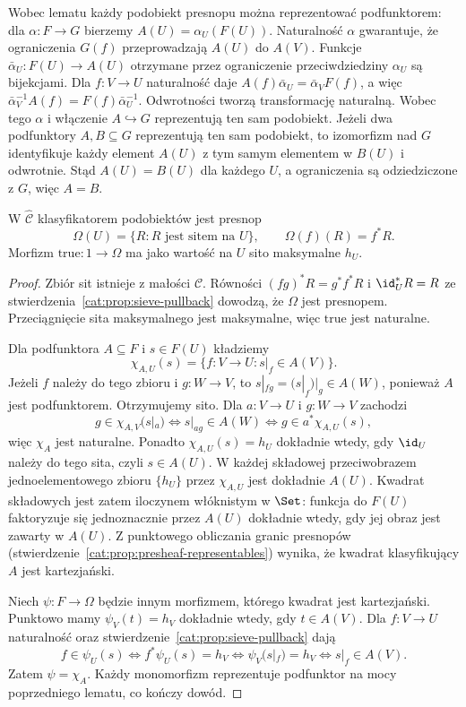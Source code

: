 Wobec lematu każdy podobiekt presnopu można reprezentować podfunktorem: dla $\alpha:F\to G$ bierzemy $A(U)=\alpha_U(F(U))$. Naturalność $\alpha$ gwarantuje, że ograniczenia $G(f)$ przeprowadzają $A(U)$ do $A(V)$. Funkcje $\bar\alpha_U:F(U)\to A(U)$ otrzymane przez ograniczenie przeciwdziedziny $\alpha_U$ są bijekcjami. Dla $f:V\to U$ naturalność daje $A(f)\bar\alpha_U=\bar\alpha_V F(f)$, a więc $\bar\alpha_V^{-1}A(f)=F(f)\bar\alpha_U^{-1}$. Odwrotności tworzą transformację naturalną. Wobec tego $\alpha$ i włączenie $A\hookrightarrow G$ reprezentują ten sam podobiekt. Jeżeli dwa podfunktory $A,B\subseteq G$ reprezentują ten sam podobiekt, to izomorfizm nad $G$ identyfikuje każdy element $A(U)$ z tym samym elementem w $B(U)$ i odwrotnie. Stąd $A(U)=B(U)$ dla każdego $U$, a ograniczenia są odziedziczone z $G$, więc $A=B$.

\begin{twierdzenie}\label{cat:thm:presheaf-classifier}
W $\widehat{\mathcal C}$ klasyfikatorem podobiektów jest presnop
\[
 \Omega(U)=\{R:R\text{ jest sitem na }U\},\qquad
 \Omega(f)(R)=f^*R.
\]
Morfizm $\mathrm{true}:1\to\Omega$ ma jako wartość na $U$ sito maksymalne $h_U$.
\end{twierdzenie}
\begin{proof}
Zbiór sit istnieje z małości $\mathcal C$. Równości $(fg)^*R=g^*f^*R$ i $\id_U^*R=R$ ze stwierdzenia~\ref{cat:prop:sieve-pullback} dowodzą, że $\Omega$ jest presnopem. Przeciągnięcie sita maksymalnego jest maksymalne, więc $\mathrm{true}$ jest naturalne.

Dla podfunktora $A\subseteq F$ i $s\in F(U)$ kładziemy
\[
 \chi_{A,U}(s)=\{f:V\to U:s|_f\in A(V)\}.
\]
Jeżeli $f$ należy do tego zbioru i $g:W\to V$, to $s|_{fg}=(s|_f)|_g\in A(W)$, ponieważ $A$ jest podfunktorem. Otrzymujemy sito. Dla $a:V\to U$ i $g:W\to V$ zachodzi
\[
 g\in\chi_{A,V}(s|_a)
 \iff s|_{ag}\in A(W)
 \iff g\in a^*\chi_{A,U}(s),
\]
więc $\chi_A$ jest naturalne. Ponadto $\chi_{A,U}(s)=h_U$ dokładnie wtedy, gdy $\id_U$ należy do tego sita, czyli $s\in A(U)$. W każdej składowej przeciwobrazem jednoelementowego zbioru $\{h_U\}$ przez $\chi_{A,U}$ jest dokładnie $A(U)$. Kwadrat składowych jest zatem iloczynem włóknistym w $\Set$: funkcja do $F(U)$ faktoryzuje się jednoznacznie przez $A(U)$ dokładnie wtedy, gdy jej obraz jest zawarty w $A(U)$. Z punktowego obliczania granic presnopów (stwierdzenie~\ref{cat:prop:presheaf-representables}) wynika, że kwadrat klasyfikujący $A$ jest kartezjański.

Niech $\psi:F\to\Omega$ będzie innym morfizmem, którego kwadrat jest kartezjański. Punktowo mamy $\psi_V(t)=h_V$ dokładnie wtedy, gdy $t\in A(V)$. Dla $f:V\to U$ naturalność oraz stwierdzenie~\ref{cat:prop:sieve-pullback} dają
\[
 f\in\psi_U(s)
 \iff f^*\psi_U(s)=h_V
 \iff \psi_V(s|_f)=h_V
 \iff s|_f\in A(V).
\]
Zatem $\psi=\chi_A$. Każdy monomorfizm reprezentuje podfunktor na mocy poprzedniego lematu, co kończy dowód.
\end{proof}

